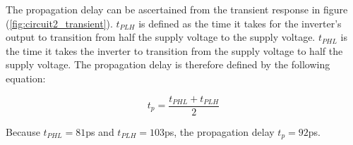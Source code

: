 The propagation delay can be ascertained from the transient response in figure (\ref{fig:circuit2_transient}). $t_{PLH}$ is defined as the time it takes for the inverter's output to transition from half the supply voltage to the supply voltage. $t_{PHL}$ is the time it takes the inverter to transition from the supply voltage to half the supply voltage. The propagation delay is therefore defined by the following equation:
 
\begin{equation}
	\label{eq:prop_delay}
	t_{p} = \frac{t_{PHL} + t_{PLH}}{2}
\end{equation}

Because $t_{PHL} = 81$\si{\pico\second} and $t_{PLH} = 103$\si{\pico\second}, the propagation delay $t_p = 92$\si{\pico\second}.
